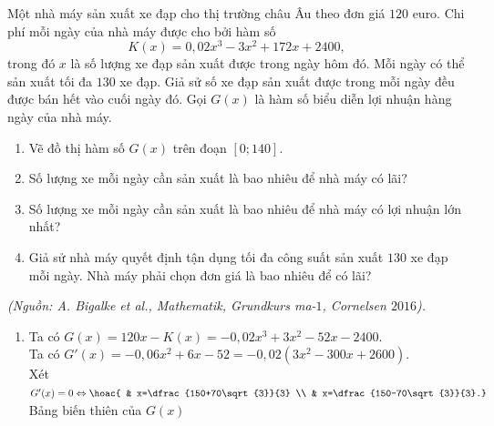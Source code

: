 \begin{bt}%
	Một nhà máy sản xuất xe đạp cho thị trường châu Âu theo đơn giá $120$ euro. Chi phí mỗi ngày của nhà máy được cho bởi hàm số
	$$K(x)=0{,}02x^3-3x^2+172x+2400,$$
	trong đó $x$ là số lượng xe đạp sản xuất được trong ngày hôm đó. Mỗi ngày có thể sản xuất tối đa $130$ xe đạp. Giả sử số xe đạp sản xuất được trong mỗi ngày đều được bán hết vào cuối ngày đó. Gọi $G(x)$ là hàm số biểu diễn lợi nhuận hàng ngày của nhà máy.
	\begin{enumerate}
		\item Vẽ đồ thị hàm số $G(x)$ trên đoạn $[0;140]$.
		\item Số lượng xe mỗi ngày cần sản xuất là bao nhiêu để nhà máy có lãi?
		\item Số lượng xe mỗi ngày cần sản xuất là bao nhiêu để nhà máy có lợi nhuận lớn nhất? 
		\item Giả sử nhà máy quyết định tận dụng tối đa công suất sản xuất $130$ xe đạp mỗi ngày. Nhà máy phải chọn đơn giá là bao nhiêu để có lãi?
	\end{enumerate}
	\begin{flushright}
		\textit{(Nguồn: A. Bigalke et al., Mathematik, Grundkurs ma-$1$, Cornelsen $2016$).}
	\end{flushright}
	\loigiai
	{
		\begin{enumerate}
			\item
			Ta có $G(x)=120x-K(x)=-0{,}02x^3+3x^2-52x-2400$. \\
			Ta có $G'(x)=-0{,}06x^2+6x-52=-0{,}02\left(3x^2-300x+2600\right)$. \\
			Xét $G'(x)=0 \Leftrightarrow \hoac{ & x=\dfrac{150+70\sqrt{3}}{3} \\ & x=\dfrac{150-70\sqrt{3}}{3}.}$ \\
			Bảng biến thiên của $G(x)$
			\begin{center}
			\end{center}

\end{enumerate}}
\end{bt}
